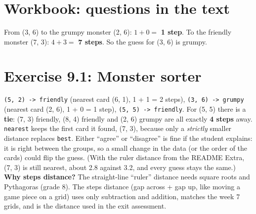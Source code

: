 
\section{Workbook: questions in the text}
\begin{answer}
From (3, 6) to the grumpy monster (2, 6): $1 + 0 = $ \textbf{1 step}. To the friendly monster (7, 3): $4 + 3 = $ \textbf{7 steps}. So the guess for (3, 6) is grumpy.
\end{answer}

\section{Exercise 9.1: Monster sorter}
\begin{answer}[Answers]
\texttt{(5, 2) -> friendly} (nearest card (6, 1), 1 + 1 = 2 steps), \texttt{(3, 6) -> grumpy} (nearest card (2, 6), 1 + 0 = 1 step), \texttt{(5, 5) -> friendly}. For (5, 5) there is a \textbf{tie}: (7, 3) friendly, (8, 4) friendly and (2, 6) grumpy are all exactly \textbf{4 steps} away. \texttt{nearest} keeps the first card it found, (7, 3), because only a \emph{strictly} smaller distance replaces \texttt{best}. Either \enquote{agree} or \enquote{disagree} is fine if the student explains: it is right between the groups, so a small change in the data (or the order of the cards) could flip the guess. (With the ruler distance from the README Extra, (7, 3) is still nearest, about 2.8 against 3.2, and every guess stays the same.)
\textbf{Why steps distance?} The straight-line \enquote{ruler} distance needs square roots and Pythagoras (grade 8). The steps distance (gap across + gap up, like moving a game piece on a grid) uses only subtraction and addition, matches the week 7 grids, and is the distance used in the exit assessment.
\end{answer}

